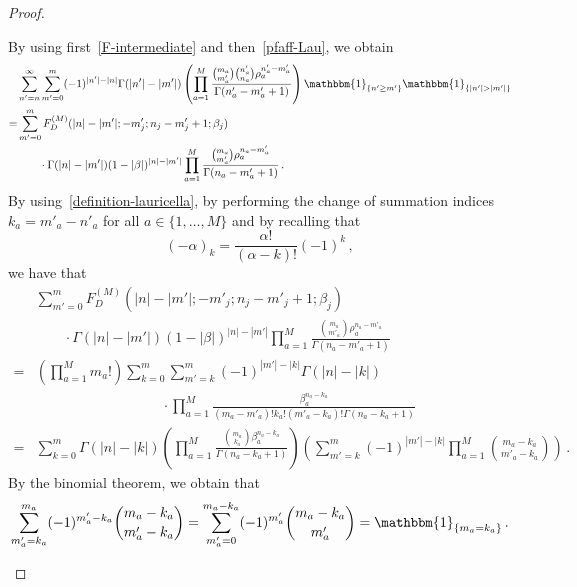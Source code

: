 \documentclass[11pt]{article}
\numberwithin{equation}{section}
\newcommand{\M}{M}
\begin{document}
\begin{proof}
\begin{itemize}
	By using first~\eqref{F-intermediate} and then~\eqref{pfaff-Lau}, we obtain 
	\begin{equation}
		\begin{split}
		&
		\sum_{n'=n}^{\infty}\sum_{m'=0}^{m}
				(-1)^{|n'|-|n|}\Gamma(|n'|-|m'|)
			\left(\prod_{a=1}^{\M}\frac{\binom{m_{a}}{m'_{a}}\binom{n'_{a}}{n_{a}}\rho_{a}^{n'_{a}-m'_{a}}}{\Gamma(n'_{a}-m'_{a}+1)}\right)\mathbbm{1}_{\{n'\geq m'\}}\mathbbm{1}_{\{|n'|> |m'|\}}
						\\=&
	\sum_{m'=0}^{m}
	F_{D}^{(\M)}(|n|-|m'|;-m'_{j};n_{j}-m'_{j}+1;\beta_{j})
	\\&\qquad \cdot
		\Gamma(|n|-|m'|)(1-|\beta|)^{|n|-|m'|}\prod_{a=1}^{\M}	\frac{\binom{m_{a}}{m'_{a}}\rho_{a}^{n_{a}-m'_{a}}}{\Gamma(n_{a}-m'_{a}+1)}\,.\end{split}
	\end{equation}
	By using~\eqref{definition-lauricella}, by performing the change of summation indices $k_{a}=m'_{a}-n'_{a}$ for all $a\in \{1,\ldots,\M\}$ and by recalling that
	\begin{equation}
		(-\alpha)_{k}
			=\frac{\alpha!}{(\alpha-k)!}(-1)^{k}\,,
	\end{equation} we have that 
	\begin{equation}
		\begin{split}
		&	\sum_{m'=0}^{m}
				F_{D}^{(\M)}(|n|-|m'|;-m'_{j};n_{j}-m'_{j}+1;\beta_{j})
		\\&\qquad \cdot
		\Gamma(|n|-|m'|)(1-|\beta|)^{|n|-|m'|}\prod_{a=1}^{\M}	\frac{\binom{m_{a}}{m'_{a}}\rho_{a}^{n_{a}-m'_{a}}}{\Gamma(n_{a}-m'_{a}+1)}																\\=&
		\left(\prod_{a=1}^{\M}m_{a}!\right)
		\sum_{k=0}^{m}
			\sum_{m'=k}^{m}	(-1)^{|m'|-|k|}\Gamma(|n|-|k|)
			\\&\qquad \qquad\qquad\qquad \quad  \cdot\prod_{a=1}^{\M}\frac{\beta_{a}^{n_{a}-k_{a}}}{(m_{a}-m'_{a})!k_{a}!(m'_{a}-k_{a})!\Gamma(n_{a}-k_{a}+1)}
		\\=&
		\sum_{k=0}^{m}
				\Gamma(|n|-|k|)\left(\prod_{a=1}^{\M}\frac{\binom{m_{a}}{k_{a}}\beta_{a}^{n_{a}-k_{a}}}{\Gamma(n_{a}-k_{a}+1)}\right)
			\left(\sum_{m'=k}^{m}
				(-1)^{|m'|-|k|}\prod_{a=1}^{\M}\binom{m_{a}-k_{a}}{m'_{a}-k_{a}}\right)\,.
\end{split}
	\end{equation}
	 By the binomial theorem, we obtain that
\begin{equation}
	\sum_{m'_{a}=k_{a}}^{m_{a}}(-1)^{m'_{a}-k_{a}}\binom{m_{a}-k_{a}}{m'_{a}-k_{a}}=\sum_{m'_{a}=0}^{m_{a}-k_{a}}(-1)^{m'_{a}}\binom{m_{a}-k_{a}}{m'_{a}}=\mathbbm{1}_{\{m_{a}=k_{a}\}}\,.

\end{equation}
\end{itemize}
\end{proof}
\end{document}
